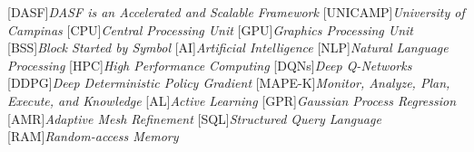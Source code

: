 [DASF]{\emph{DASF is an Accelerated and Scalable Framework}}
[UNICAMP]{\emph{University of Campinas}}
[CPU]{\emph{Central Processing Unit}}
[GPU]{\emph{Graphics Processing Unit}}
[BSS]{\emph{Block Started by Symbol}}
[AI]{\emph{Artificial Intelligence}}
[NLP]{\emph{Natural Language Processing}}
[HPC]{\emph{High Performance Computing}}
[DQNs]{\emph{Deep Q-Networks}}
[DDPG]{\emph{Deep Deterministic Policy Gradient}}
[MAPE-K]{\emph{Monitor, Analyze, Plan, Execute, and Knowledge}}
[AL]{\emph{Active Learning}}
[GPR]{\emph{Gaussian Process Regression}}
[AMR]{\emph{Adaptive Mesh Refinement}}
[SQL]{\emph{Structured Query Language}}
[RAM]{\emph{Random-access Memory}}
